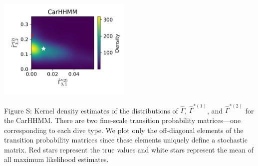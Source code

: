 \documentclass{article}
\begin{document}
\begin{center}
        \includegraphics[width=2.5in]{../Plots/hhmm_V_Gamma_density_1_row_2.png}
        \end{center}
        
        \noindent Figure S: Kernel density estimates of the distributions of $\hat \Gamma$, $\hat \Gamma^{*(1)}$, and $\hat \Gamma^{*(2)}$ for the CarHHMM. There are two fine-scale transition probability matrices---one corresponding to each dive type. We plot only the off-diagonal elements of the transition probability matrices since these elements uniquely define a stochastic matrix. Red stars represent the true values and white stars represent the mean of all maximum likelihood estimates.
        \addtocounter{fignum}{1}
        
        \newpage
\end{document}
